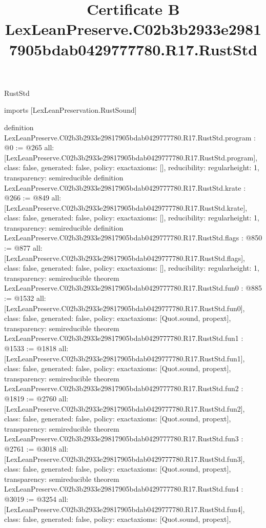 \begin{lexlean}{RustStd}
\title{Certificate B LexLeanPreserve.C02b3b2933e29817905bdab0429777780.R17.RustStd}
\begin{coremodule}
imports [LexLeanPreservation.RustSound]

definition LexLeanPreserve.C02b3b2933e29817905bdab0429777780.R17.RustStd.program : @0 := @265 {
  all: [LexLeanPreserve.C02b3b2933e29817905bdab0429777780.R17.RustStd.program],
  class: false,
  generated: false,
  policy: exact{axioms: []},
  reducibility: regular{height: 1},
  transparency: semireducible
}
definition LexLeanPreserve.C02b3b2933e29817905bdab0429777780.R17.RustStd.krate : @266 := @849 {
  all: [LexLeanPreserve.C02b3b2933e29817905bdab0429777780.R17.RustStd.krate],
  class: false,
  generated: false,
  policy: exact{axioms: []},
  reducibility: regular{height: 1},
  transparency: semireducible
}
definition LexLeanPreserve.C02b3b2933e29817905bdab0429777780.R17.RustStd.flags : @850 := @877 {
  all: [LexLeanPreserve.C02b3b2933e29817905bdab0429777780.R17.RustStd.flags],
  class: false,
  generated: false,
  policy: exact{axioms: []},
  reducibility: regular{height: 1},
  transparency: semireducible
}
theorem LexLeanPreserve.C02b3b2933e29817905bdab0429777780.R17.RustStd.fun0 : @885 := @1532 {
  all: [LexLeanPreserve.C02b3b2933e29817905bdab0429777780.R17.RustStd.fun0],
  class: false,
  generated: false,
  policy: exact{axioms: [Quot.sound, propext]},
  transparency: semireducible
}
theorem LexLeanPreserve.C02b3b2933e29817905bdab0429777780.R17.RustStd.fun1 : @1533 := @1818 {
  all: [LexLeanPreserve.C02b3b2933e29817905bdab0429777780.R17.RustStd.fun1],
  class: false,
  generated: false,
  policy: exact{axioms: [Quot.sound, propext]},
  transparency: semireducible
}
theorem LexLeanPreserve.C02b3b2933e29817905bdab0429777780.R17.RustStd.fun2 : @1819 := @2760 {
  all: [LexLeanPreserve.C02b3b2933e29817905bdab0429777780.R17.RustStd.fun2],
  class: false,
  generated: false,
  policy: exact{axioms: [Quot.sound, propext]},
  transparency: semireducible
}
theorem LexLeanPreserve.C02b3b2933e29817905bdab0429777780.R17.RustStd.fun3 : @2761 := @3018 {
  all: [LexLeanPreserve.C02b3b2933e29817905bdab0429777780.R17.RustStd.fun3],
  class: false,
  generated: false,
  policy: exact{axioms: [Quot.sound, propext]},
  transparency: semireducible
}
theorem LexLeanPreserve.C02b3b2933e29817905bdab0429777780.R17.RustStd.fun4 : @3019 := @3254 {
  all: [LexLeanPreserve.C02b3b2933e29817905bdab0429777780.R17.RustStd.fun4],
  class: false,
  generated: false,
  policy: exact{axioms: [Quot.sound, propext]},
}
\end{coremodule}
\end{lexlean}
